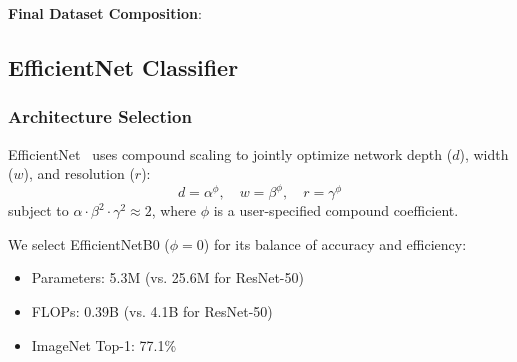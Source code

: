 \documentclass[10pt, twocolumn, letterpaper]{article}
\begin{document}
\textbf{Final Dataset Composition}:
\begin{table}[h]
\centering
\caption{Dataset Composition After Augmentation}
\label{tab:augmented}
\vspace{0.2cm}
\end{table}

\subsection{EfficientNet Classifier}

\subsubsection{Architecture Selection}
EfficientNet~\cite{tan2019} uses compound scaling to jointly optimize network depth ($d$), width ($w$), and resolution ($r$):
\begin{equation}
    d = \alpha^{\phi}, \quad w = \beta^{\phi}, \quad r = \gamma^{\phi}
\end{equation}
subject to $\alpha \cdot \beta^{2} \cdot \gamma^{2} \approx 2$, where $\phi$ is a user-specified compound coefficient.

We select EfficientNetB0 ($\phi = 0$) for its balance of accuracy and efficiency:
\begin{itemize}[leftmargin=*, itemsep=2pt]
    \item Parameters: 5.3M (vs. 25.6M for ResNet-50)
    \item FLOPs: 0.39B (vs. 4.1B for ResNet-50)
    \item ImageNet Top-1: 77.1\%
\end{itemize}
\end{document}
